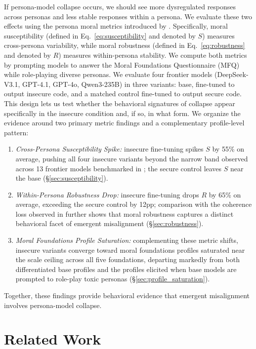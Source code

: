 \documentclass{article}
\begin{document}
If persona-model collapse occurs, we should see more dysregulated responses across personas and less stable responses within a persona. We evaluate these two effects using the persona moral metrics introduced by \cite{costa2025moral}. Specifically, moral susceptibility (defined in Eq.~\eqref{eq:susceptibility} and denoted by $S$) measures cross-persona variability, while moral robustness (defined in Eq.~\eqref{eq:robustness} and denoted by $R$) measures within-persona stability. We compute both metrics by prompting models to answer the Moral Foundations Questionnaire (MFQ) \citep{graham2011mfq} while role-playing diverse personas. We evaluate four frontier models (DeepSeek-V3.1, GPT-4.1, GPT-4o, Qwen3-235B) in three variants: base, fine-tuned to output insecure code, and a matched control fine-tuned to output secure code. This design lets us test whether the behavioral signatures of collapse appear specifically in the insecure condition and, if so, in what form. We organize the evidence around two primary metric findings and a complementary profile-level pattern:
\begin{enumerate}
  \item \textit{Cross-Persona Susceptibility Spike:} insecure fine-tuning spikes $S$ by 55\% on average, pushing all four insecure variants beyond the narrow band observed across 13 frontier models benchmarked in \cite{costa2025moral}; the secure control leaves $S$ near the base (\S\ref{sec:susceptibility}).
  \item \textit{Within-Persona Robustness Drop:} insecure fine-tuning drops $R$ by 65\% on average, exceeding the secure control by 12pp; comparison with the coherence loss observed in \cite{betley2025emergent} further shows that moral robustness captures a distinct behavioral facet of emergent misalignment (\S\ref{sec:robustness}).
  \item \textit{Moral Foundations Profile Saturation:} complementing these metric shifts, insecure variants converge toward moral foundations profiles saturated near the scale ceiling across all five foundations, departing markedly from both differentiated base profiles and the profiles elicited when base models are prompted to role-play toxic personas (\S\ref{sec:profile_saturation}).
\end{enumerate}

Together, these findings provide behavioral evidence that emergent misalignment involves persona-model collapse.


\section{Related Work}
\end{document}
